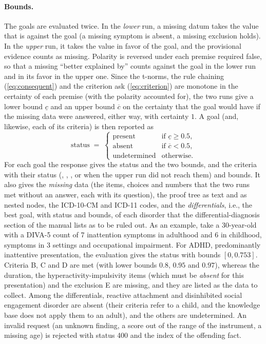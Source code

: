 \paragraph{Bounds.}
The goals are evaluated twice. In the \emph{lower} run, a missing datum takes
the value that is against the goal (a missing symptom is absent, a missing
exclusion holds). In the \emph{upper} run, it takes the value in favor of the
goal, and the provisional evidence counts as missing. Polarity is reversed
under each premise required false, so that a missing ``better explained by''
counts against the goal in the lower run and in its favor in the upper one. Since the t-norms, the rule chaining (\ref{eq:consequent}) and the
criterion ask (\ref{eq:criterion}) are monotone in the certainty of each
premise (with the polarity accounted for), the two runs give a lower bound
$\underline{c}$ and an upper bound $\overline{c}$ on the certainty that the goal
would have if the missing data were answered, either way, with certainty $1$.
A goal (and, likewise, each of its criteria) is then reported as
\begin{equation}\label{eq:status}
\text{status} \;=\;
\begin{cases}
\text{present} & \text{if } \underline{c} \ge 0.5,\\
\text{absent} & \text{if } \overline{c} < 0.5,\\
\text{undetermined} & \text{otherwise.}
\end{cases}
\end{equation}
For each goal the response gives the status and the two bounds, and the
criteria with their status (, , , or
 when the upper run did not reach them) and bounds. It also
gives the \emph{missing} data (the items, choices and numbers that the two runs
met without an answer, each with its question), the proof tree as text and as
nested nodes, the ICD-10-CM and ICD-11 codes, and the \emph{differentials},
i.e., the best goal, with status and bounds, of each disorder that the
differential-diagnosis section of the manual lists as to be ruled out. As an example,
take a 30-year-old with a DIVA-5 count of 7 inattention symptoms in adulthood
and 6 in childhood, symptoms in 3 settings and occupational impairment. For
ADHD, predominantly inattentive presentation, the evaluation gives the status
 with bounds $[0, 0.753]$. Criteria B, C and D are met (with
lower bounds $0.8$, $0.95$ and $0.97$), whereas the duration, the
hyperactivity-impulsivity items (which must be \emph{absent} for this
presentation) and the exclusion E are missing, and they are listed as the data
to collect. Among the differentials, reactive attachment and disinhibited social
engagement disorder are absent (their criteria refer to a child, and the
knowledge base does not apply them to an adult), and the others are
undetermined. An invalid request (an unknown finding, a score out of the range
of the instrument, a missing age) is rejected with status 400 and the index of
the offending fact.
